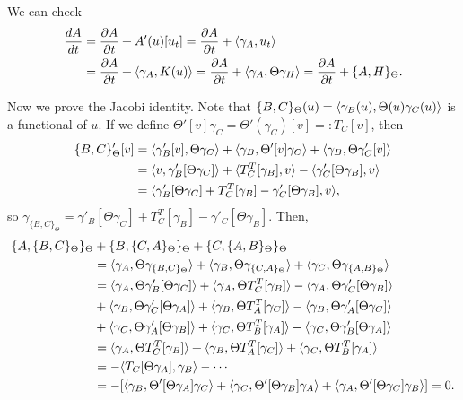 \documentclass{../../../small}
\begin{document}
We can check
\begin{align*}
\frac{dA}{dt}&=\frac{\partial A}{\partial t}+A'(u)[u_t]=\frac{\partial A}{\partial t}+\langle\gamma_A,u_t\rangle\\
&=\frac{\partial A}{\partial t}+\langle\gamma_A,K(u)\rangle=\frac{\partial A}{\partial t}+\langle\gamma_A,\Theta\gamma_H\rangle=\frac{\partial A}{\partial t}+\{A,H\}_{\Theta}.
\end{align*}

Now we prove the Jacobi identity.
Note that $\{B,C\}_{\Theta}(u)=\langle\gamma_B(u),\Theta(u)\gamma_C(u)\rangle$ is a functional of $u$.
If we define $\Theta'[v]\gamma_C=\Theta'(\gamma_C)[v]=:T_C[v]$, then
\begin{align*}
\{B,C\}_\Theta'[v]
&=\langle\gamma_B'[v],\Theta\gamma_C\rangle+\langle\gamma_B,\Theta'[v]\gamma_C\rangle+\langle\gamma_B,\Theta\gamma_C'[v]\rangle\\
&=\langle v,\gamma_B'[\Theta\gamma_C]\rangle+\langle T_C^T[\gamma_B],v\rangle-\langle\gamma'_C[\Theta\gamma_B],v\rangle\\
&=\langle\gamma'_B[\Theta\gamma_C]+T_C^T[\gamma_B]-\gamma'_C[\Theta\gamma_B],v\rangle,
\end{align*}
so $\gamma_{\{B,C\}_\Theta}=\gamma'_B[\Theta\gamma_C]+T_C^T[\gamma_B]-\gamma'_C[\Theta\gamma_B]$.
Then,
\begin{align*}
\{A,\{B,C\}_\Theta\}_\Theta&+
\{B,\{C,A\}_\Theta\}_\Theta+
\{C,\{A,B\}_\Theta\}_\Theta\\
&=\langle\gamma_A,\Theta\gamma_{\{B,C\}_\Theta}\rangle+\langle\gamma_B,\Theta\gamma_{\{C,A\}_\Theta}\rangle+\langle\gamma_C,\Theta\gamma_{\{A,B\}_\Theta}\rangle\\
&=\langle\gamma_A,\Theta\gamma'_B[\Theta\gamma_C]\rangle+\langle\gamma_A,\Theta T_C^T[\gamma_B]\rangle-\langle\gamma_A,\Theta\gamma'_C[\Theta\gamma_B]\rangle\\
&+\langle\gamma_B,\Theta\gamma'_C[\Theta\gamma_A]\rangle+\langle\gamma_B,\Theta T_A^T[\gamma_C]\rangle-\langle\gamma_B,\Theta\gamma'_A[\Theta\gamma_C]\rangle\\
&+\langle\gamma_C,\Theta\gamma'_A[\Theta\gamma_B]\rangle+\langle\gamma_C,\Theta T_B^T[\gamma_A]\rangle-\langle\gamma_C,\Theta\gamma'_B[\Theta\gamma_A]\rangle\\
&=\langle\gamma_A,\Theta T_C^T[\gamma_B]\rangle+\langle\gamma_B,\Theta T_A^T[\gamma_C]\rangle+\langle\gamma_C,\Theta T_B^T[\gamma_A]\rangle\\
&=-\langle T_C[\Theta\gamma_A],\gamma_B\rangle-\cdots\\
&=-[\langle\gamma_B,\Theta'[\Theta\gamma_A]\gamma_C\rangle+\langle\gamma_C,\Theta'[\Theta\gamma_B]\gamma_A\rangle+\langle\gamma_A,\Theta'[\Theta\gamma_C]\gamma_B\rangle]=0.
\end{align*}
\end{document}
